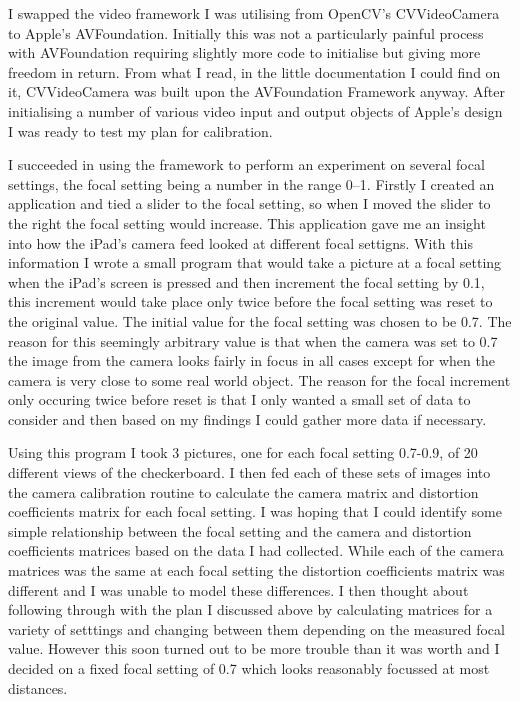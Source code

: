\documentclass{article}
\begin{document}
I swapped the video framework I was utilising from OpenCV's CVVideoCamera to Apple's AVFoundation. Initially this was not a particularly painful process with AVFoundation requiring slightly more code to initialise but giving more freedom in return. From what I read, in the little documentation I could find on it, CVVideoCamera was built upon the AVFoundation Framework anyway. After initialising a number of various video input and output objects of Apple's design I was ready to test my plan for calibration. 

I succeeded in using the framework to perform an experiment on several focal settings, the focal setting being a number in the range 0--1. Firstly I created an application and tied a slider to the focal setting, so when I moved the slider to the right the focal setting would increase. This application gave me an insight into how the iPad's camera feed looked at different focal settigns. With this information I wrote a small program that would take a picture at a focal setting when the iPad's screen is pressed and then increment the focal setting by 0.1, this increment would take place only twice before the focal setting was reset to the original value. The initial value for the focal setting was chosen to be 0.7. The reason for this seemingly arbitrary value is that when the camera was set to 0.7 the image from the camera looks fairly in focus in all cases except for when the camera is very close to some real world object. The reason for the focal increment only occuring twice before reset is that I only wanted a small set of data to consider and then based on my findings I could gather more data if necessary. \par

Using this program I took 3 pictures, one for each focal setting 0.7-0.9, of 20 different views of the checkerboard. I then fed each of these sets of images into the camera calibration routine to calculate the camera matrix and distortion coefficients matrix for each focal setting. I was hoping that I could identify some simple relationship between the focal setting and the camera and distortion coefficients matrices based on the data I had collected. While each of the camera matrices was the same at each focal setting the distortion coefficients matrix was different and I was unable to model these differences. I then thought about following through with the plan I discussed above by calculating matrices for a variety of setttings and changing between them depending on the measured focal value. However this soon turned out to be more trouble than it was worth and I decided on a fixed focal setting of 0.7 which looks reasonably focussed at most distances.
\end{document}
